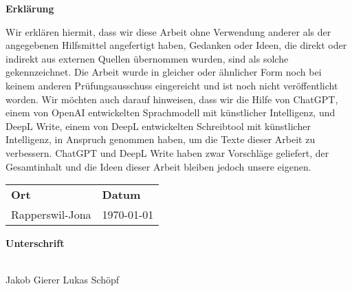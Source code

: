 %
%
%
\pagestyle{plain}
\vspace{0.8cm}
\noindent
\textbf{\Huge Erklärung}
\vspace{1cm}

Wir erklären hiermit, dass wir diese Arbeit ohne Verwendung anderer als der angegebenen Hilfsmittel angefertigt haben, Gedanken oder Ideen, die direkt oder indirekt aus externen Quellen übernommen wurden, sind als solche gekennzeichnet. Die Arbeit wurde in gleicher oder ähnlicher Form noch bei keinem anderen Prüfungsausschuss eingereicht und ist noch nicht veröffentlicht worden. 
Wir möchten auch darauf hinweisen, dass wir die Hilfe von ChatGPT, einem von OpenAI entwickelten Sprachmodell mit künstlicher Intelligenz, und DeepL Write, einem von DeepL entwickelten Schreibtool mit künstlicher Intelligenz, in Anspruch genommen haben, um die Texte dieser Arbeit zu verbessern.
ChatGPT und DeepL Write haben zwar Vorschläge geliefert, der Gesamtinhalt und die Ideen dieser Arbeit bleiben jedoch unsere eigenen.
\vspace{1cm}

\noindent
\begin{tabular}{@{}l@{} l}    
    \textbf{Ort} & \textbf{Datum} \\
    Rapperswil-Jona \hspace{0.5cm}  & \today
\end{tabular}
\vspace{2.5cm}

\noindent
\textbf{Unterschrift} 
\vspace{0.5cm}

\noindent
\makebox[5cm]{\hrulefill} \hspace{2cm} \makebox[5cm]{\hrulefill}\\
\vspace{1.0cm}
Jakob Gierer \hspace{5.2cm} Lukas Schöpf

\clearpage